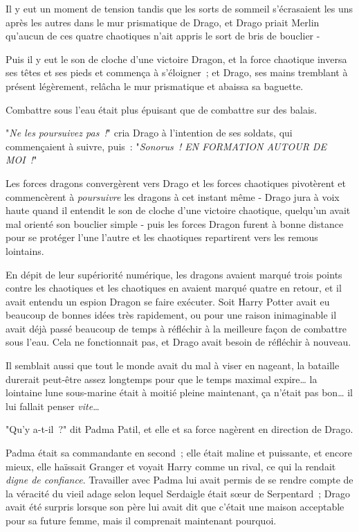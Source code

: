 Il y eut un moment de tension tandis que les sorts de sommeil s'écrasaient les uns après les autres dans le mur prismatique de Drago, et Drago priait Merlin qu'aucun de ces quatre chaotiques n'ait appris le sort de bris de bouclier -

Puis il y eut le son de cloche d'une victoire Dragon, et la force chaotique inversa ses têtes et ses pieds et commença à s'éloigner~; et Drago, ses mains tremblant à présent légèrement, relâcha le mur prismatique et abaissa sa baguette.

Combattre sous l'eau était plus épuisant que de combattre sur des balais.

"\emph{Ne les poursuivez pas~!}" cria Drago à l'intention de ses soldats, qui commençaient à suivre, puis~: "\emph{Sonorus~! EN FORMATION AUTOUR DE MOI~!}"

Les forces dragons convergèrent vers Drago et les forces chaotiques pivotèrent et commencèrent à \emph{poursuivre} les dragons à cet instant même - Drago jura à voix haute quand il entendit le son de cloche d'une victoire chaotique, quelqu'un avait mal orienté son bouclier simple - puis les forces Dragon furent à bonne distance pour se protéger l'une l'autre et les chaotiques repartirent vers les remous lointains.

En dépit de leur supériorité numérique, les dragons avaient marqué trois points contre les chaotiques et les chaotiques en avaient marqué quatre en retour, et il avait entendu un espion Dragon se faire exécuter. Soit Harry Potter avait eu beaucoup de bonnes idées très rapidement, ou pour une raison inimaginable il avait déjà passé beaucoup de temps à réfléchir à la meilleure façon de combattre sous l'eau. Cela ne fonctionnait pas, et Drago avait besoin de réfléchir à nouveau.

Il semblait aussi que tout le monde avait du mal à viser en nageant, la bataille durerait peut-être assez longtemps pour que le temps maximal expire… la lointaine lune sous-marine était à moitié pleine maintenant, ça n'était pas bon… il lui fallait penser \emph{vite}…

"Qu'y a-t-il~?" dit Padma Patil, et elle et sa force nagèrent en direction de Drago.

Padma était sa commandante en second~; elle était maline et puissante, et encore mieux, elle haïssait Granger et voyait Harry comme un rival, ce qui la rendait \emph{digne de confiance}. Travailler avec Padma lui avait permis de se rendre compte de la véracité du vieil adage selon lequel Serdaigle était sœur de Serpentard~; Drago avait été surpris lorsque son père lui avait dit que c'était une maison acceptable pour sa future femme, mais il comprenait maintenant pourquoi.

